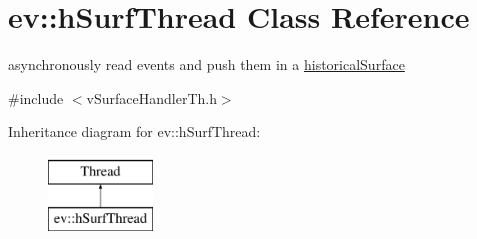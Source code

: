\hypertarget{classev_1_1hSurfThread}{}\section{ev\+:\+:h\+Surf\+Thread Class Reference}
\label{classev_1_1hSurfThread}


asynchronously read events and push them in a \hyperlink{classev_1_1historicalSurface}{historical\+Surface}  




{\ttfamily \#include $<$v\+Surface\+Handler\+Th.\+h$>$}

Inheritance diagram for ev\+:\+:h\+Surf\+Thread\+:\begin{figure}[H]
\begin{center}
\leavevmode
\includegraphics[height=2.000000cm]{classev_1_1hSurfThread}
\end{center}
\end{figure}

